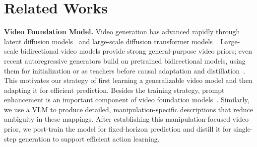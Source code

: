\section{Related Works}
\textbf{Video Foundation Model.}
Video generation has advanced rapidly through latent diffusion models~\citep{blattmann2023align,blattmann2023stable} and large-scale diffusion transformer models~\citep{yang2025cogvideox,wan2025wan,agarwal2025cosmos,agarwal2026cosmos}. Large-scale bidirectional video models provide strong general-purpose video priors; even recent autoregressive generators build on pretrained bidirectional models, using them for initialization or as teachers before causal adaptation and distillation~\citep{yin2025causvid,huang2025selfforcing}. This motivates our strategy of first learning a generalizable video model and then adapting it for efficient prediction. 
Besides the training strategy, prompt enhancement is an important component of video foundation models~\citep{yang2025cogvideox,wan2025wan}. Similarly, we use a VLM to produce detailed, manipulation-specific descriptions that reduce ambiguity in these mappings. After establishing this manipulation-focused video prior, we post-train the model for fixed-horizon prediction and distill it for single-step generation to support efficient action learning.



